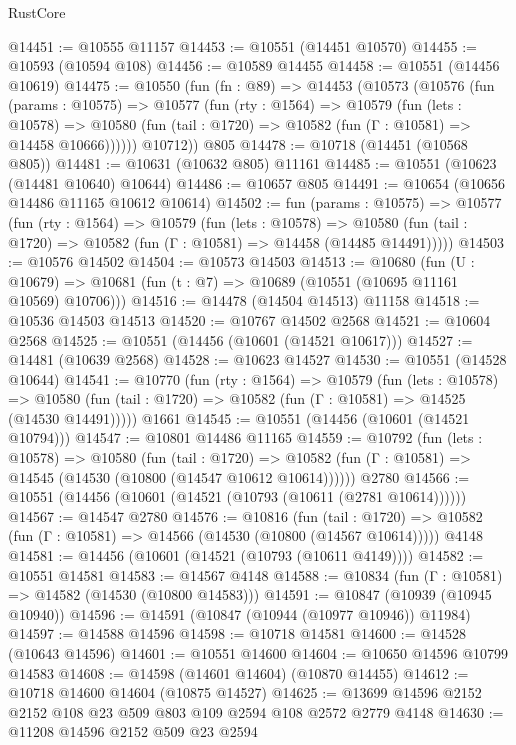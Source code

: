 \begin{lexlean}{RustCore}
\begin{coremodule}
@14451 := @10555 @11157
@14453 := @10551 (@14451 @10570)
@14455 := @10593 (@10594 @108)
@14456 := @10589 @14455
@14458 := @10551 (@14456 @10619)
@14475 := @10550
    (fun (fn : @89) =>
    @14453
      (@10573
        (@10576
          (fun (params : @10575) =>
          @10577
            (fun (rty : @1564) =>
            @10579
              (fun (lets : @10578) =>
              @10580 (fun (tail : @1720) => @10582 (fun (Γ : @10581) => @14458 @10666))))))
        @10712))
    @805
@14478 := @10718 (@14451 (@10568 @805))
@14481 := @10631 (@10632 @805) @11161
@14485 := @10551 (@10623 (@14481 @10640) @10644)
@14486 := @10657 @805
@14491 := @10654 (@10656 @14486 @11165 @10612 @10614)
@14502 := fun (params : @10575) =>
  @10577
    (fun (rty : @1564) =>
    @10579
      (fun (lets : @10578) =>
      @10580 (fun (tail : @1720) => @10582 (fun (Γ : @10581) => @14458 (@14485 @14491)))))
@14503 := @10576 @14502
@14504 := @10573 @14503
@14513 := @10680
    (fun (U : @10679) => @10681 (fun (t : @7) => @10689 (@10551 (@10695 @11161 @10569) @10706)))
@14516 := @14478 (@14504 @14513) @11158
@14518 := @10536 @14503 @14513
@14520 := @10767 @14502 @2568
@14521 := @10604 @2568
@14525 := @10551 (@14456 (@10601 (@14521 @10617)))
@14527 := @14481 (@10639 @2568)
@14528 := @10623 @14527
@14530 := @10551 (@14528 @10644)
@14541 := @10770
    (fun (rty : @1564) =>
    @10579
      (fun (lets : @10578) =>
      @10580 (fun (tail : @1720) => @10582 (fun (Γ : @10581) => @14525 (@14530 @14491)))))
    @1661
@14545 := @10551 (@14456 (@10601 (@14521 @10794)))
@14547 := @10801 @14486 @11165
@14559 := @10792
    (fun (lets : @10578) =>
    @10580
      (fun (tail : @1720) =>
      @10582 (fun (Γ : @10581) => @14545 (@14530 (@10800 (@14547 @10612 @10614))))))
    @2780
@14566 := @10551 (@14456 (@10601 (@14521 (@10793 (@10611 (@2781 @10614))))))
@14567 := @14547 @2780
@14576 := @10816
    (fun (tail : @1720) => @10582 (fun (Γ : @10581) => @14566 (@14530 (@10800 (@14567 @10614)))))
    @4148
@14581 := @14456 (@10601 (@14521 (@10793 (@10611 @4149))))
@14582 := @10551 @14581
@14583 := @14567 @4148
@14588 := @10834 (fun (Γ : @10581) => @14582 (@14530 (@10800 @14583)))
@14591 := @10847 (@10939 (@10945 @10940))
@14596 := @14591 (@10847 (@10944 (@10977 @10946)) @11984)
@14597 := @14588 @14596
@14598 := @10718 @14581
@14600 := @14528 (@10643 @14596)
@14601 := @10551 @14600
@14604 := @10650 @14596 @10799 @14583
@14608 := @14598 (@14601 @14604) (@10870 @14455)
@14612 := @10718 @14600 @14604 (@10875 @14527)
@14625 := @13699 @14596 @2152 @2152 @108 @23 @509 @803 @109 @2594 @108 @2572 @2779 @4148
@14630 := @11208 @14596 @2152 @509 @23 @2594

\end{coremodule}
\end{lexlean}
